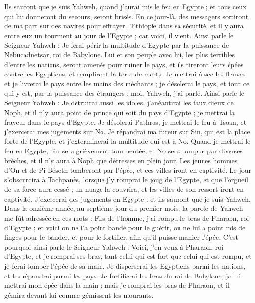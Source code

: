\begin{multicols}{2}
Ils sauront que je suis Yahweh, quand j'aurai mis le feu en Egypte ; et tous ceux qui lui donneront du secours, seront brisés.
En ce jour-là, des messagers sortiront de ma part sur des navires pour effrayer l’Ethiopie dans sa sécurité, et il y aura entre eux un tourment au jour de l’Egypte ; car voici, il vient.
Ainsi parle le Seigneur Yahweh : Je ferai périr la multitude d'Egypte par la puissance de Nebucadnetsar, roi de Babylone.
Lui et son peuple avec lui, les plus terribles d'entre les nations, seront amenés pour ruiner le pays, et ils tireront leurs épées contre les Egyptiens, et rempliront la terre de morts.
Je mettrai à sec les fleuves et je livrerai le pays entre les mains des méchants ; je désolerai le pays, et tout ce qui y est, par la puissance des étrangers ; moi, Yahweh, j'ai parlé.
Ainsi parle le Seigneur Yahweh : Je détruirai aussi les idoles, j'anéantirai les faux dieux de Noph, et il n'y aura point de prince qui soit du pays d'Egypte ; je mettrai la frayeur dans le pays d'Egypte.
Je désolerai Pathros, je mettrai le feu à Tsoan, et j'exercerai mes jugements sur No.
Je répandrai ma fureur sur Sin, qui est la place forte de l'Egypte, et j'exterminerai la multitude qui est à No.
Quand je mettrai le feu en Egypte, Sin sera grièvement tourmentée, et No sera rompue par diverses brèches, et il n'y aura à Noph que détresses en plein jour.
Les jeunes hommes d’On et de Pi-Béseth tomberont par l'épée, et ces villes iront en captivité.
Le jour s’obscurcira à Tachpanès, lorsque j'y romprai le joug de l'Egypte, et que l'orgueil de sa force aura cessé ; un nuage la couvrira, et les villes de son ressort iront en captivité.
J'exercerai des jugements en Egypte ; et ils sauront que je suis Yahweh.
Dans la onzième année, au septième jour du premier mois, la parole de Yahweh me fût adressée en ces mots :
Fils de l’homme, j'ai rompu le bras de Pharaon, roi d'Egypte ; et voici on ne l'a point bandé pour le guérir, on ne lui a point mis de linges pour le bander, et pour le fortifier, afin qu'il puisse manier l'épée.
C'est pourquoi ainsi parle le Seigneur Yahweh : Voici, j'en veux à Pharaon, roi d'Egypte, et je romprai ses bras, tant celui qui est fort que celui qui est rompu, et je ferai tomber l'épée de sa main.
Je disperserai les Egyptiens parmi les nations, et les répandrai parmi les pays.
Je fortifierai les bras du roi de Babylone, je lui mettrai mon épée dans la main ; mais je romprai les bras de Pharaon, et il gémira devant lui comme gémissent les mourants.

\end{multicols}
